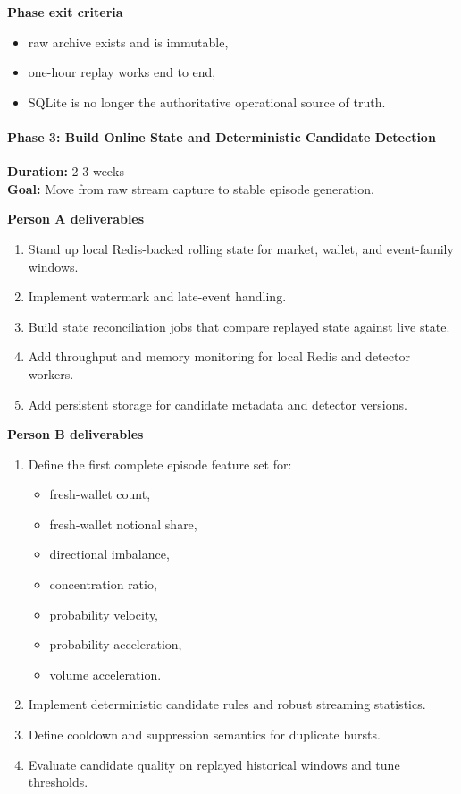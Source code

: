 \documentclass[
]{article}
\providecommand{\tightlist}{%
  \setlength{\itemsep}{0pt}\setlength{\parskip}{0pt}}
\begin{document}
\textbf{Phase exit criteria}

\begin{itemize}
\tightlist
\item
  raw archive exists and is immutable,
\item
  one-hour replay works end to end,
\item
  SQLite is no longer the authoritative operational source of truth.
\end{itemize}

\paragraph{Phase 3: Build Online State and Deterministic Candidate
Detection}\label{phase-3-build-online-state-and-deterministic-candidate-detection}

\textbf{Duration:} 2-3 weeks\\
\textbf{Goal:} Move from raw stream capture to stable episode
generation.

\textbf{Person A deliverables}

\begin{enumerate}
\def\labelenumi{\arabic{enumi}.}
\tightlist
\item
  Stand up local Redis-backed rolling state for market, wallet, and
  event-family windows.
\item
  Implement watermark and late-event handling.
\item
  Build state reconciliation jobs that compare replayed state against
  live state.
\item
  Add throughput and memory monitoring for local Redis and detector
  workers.
\item
  Add persistent storage for candidate metadata and detector versions.
\end{enumerate}

\textbf{Person B deliverables}

\begin{enumerate}
\def\labelenumi{\arabic{enumi}.}
\tightlist
\item
  Define the first complete episode feature set for:

  \begin{itemize}
  \tightlist
  \item
    fresh-wallet count,
  \item
    fresh-wallet notional share,
  \item
    directional imbalance,
  \item
    concentration ratio,
  \item
    probability velocity,
  \item
    probability acceleration,
  \item
    volume acceleration.
  \end{itemize}
\item
  Implement deterministic candidate rules and robust streaming
  statistics.
\item
  Define cooldown and suppression semantics for duplicate bursts.
\item
  Evaluate candidate quality on replayed historical windows and tune
  thresholds.
\end{enumerate}
\end{document}
